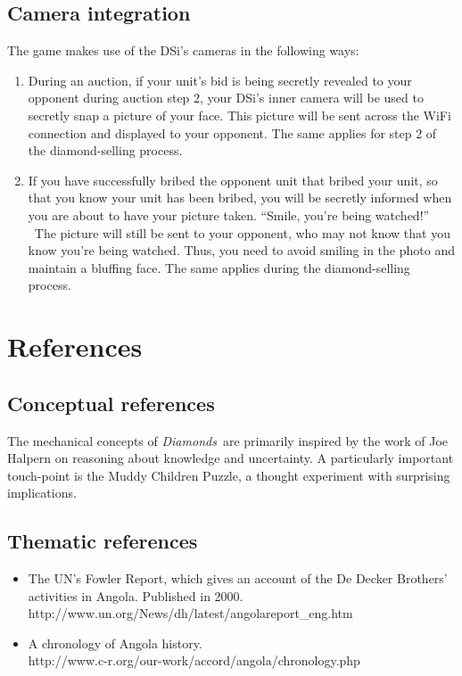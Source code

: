 \documentclass[12pt]{article}
\newcommand{\gtitle}{{\it Diamonds}}
\begin{document}
\subsection{Camera integration}
The game makes use of the DSi's cameras in the following ways:
\begin{enumerate}

\item During an auction, if your unit's bid is being secretly revealed to your opponent during auction step 2, your DSi's inner camera will be used to secretly snap a picture of your face.  This picture will be sent across the WiFi connection and displayed to your opponent.  The same applies for step 2 of the diamond-selling process.

\item If you have successfully bribed the opponent unit that bribed your unit, so that you know your unit has been bribed, you will be secretly informed when you are about to have your picture taken.  ``Smile, you're being watched!'' \  The picture will still be sent to your opponent, who may not know that you know you're being watched.  Thus, you need to avoid smiling in the photo and maintain a bluffing face.  The same applies during the diamond-selling process.

\end{enumerate}

\section{References}

\subsection{Conceptual references}
The mechanical concepts of \gtitle\ are primarily inspired by the work of Joe Halpern on reasoning about knowledge and uncertainty.  A particularly important touch-point is the Muddy Children Puzzle, a thought experiment with surprising implications.


\subsection{Thematic references}
\begin{itemize}
\item The UN's Fowler Report, which gives an account of the De Decker Brothers' activities in Angola.  Published in 2000.\\
http://www.un.org/News/dh/latest/angolareport\_eng.htm

\item A chronology of Angola history.\\
http://www.c-r.org/our-work/accord/angola/chronology.php
\end{itemize}
\end{document}
